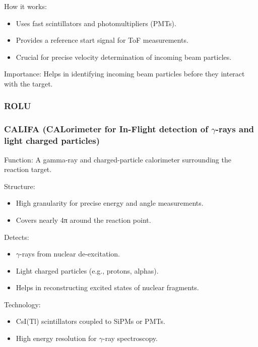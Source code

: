 How it works:

\begin{itemize}
	\item Uses fast scintillators and photomultipliers (PMTs).
	\item Provides a reference start signal for ToF measurements.
	\item Crucial for precise velocity determination of incoming beam particles.
\end{itemize}

Importance: Helps in identifying incoming beam particles before they interact with the target.


\subsubsection{ROLU}

\subsubsection{CALIFA (CALorimeter for In-Flight detection of $\gamma$-rays and light charged particles)}

Function: A gamma-ray and charged-particle calorimeter surrounding the reaction target.

Structure:

\begin{itemize}
	\item High granularity for precise energy and angle measurements.
	\item Covers nearly 4π around the reaction point.
\end{itemize}


Detects:

\begin{itemize}
	\item $\gamma$-rays from nuclear de-excitation.
	\item Light charged particles (e.g., protons, alphas).
	\item Helps in reconstructing excited states of nuclear fragments.
\end{itemize}

Technology:

\begin{itemize}
	\item CsI(Tl) scintillators coupled to SiPMs or PMTs.
	\item High energy resolution for $\gamma$-ray spectroscopy.
\end{itemize}


